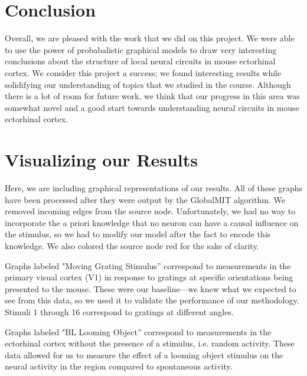 \documentclass{article}
\begin{document}
\section{Conclusion}

Overall, we are pleased with the work that we did on this project. We were 
able to use the power of probabalistic graphical models to draw very 
interesting conclusions about the structure of local neural circuits in mouse 
ectorhinal cortex. We consider this project a success; we found interesting 
results while solidifying our understanding of topics that we studied in the 
course. Although there is a lot of room for future work, we think that our 
progress in this area was somewhat novel and a good start towards 
understanding neural circuits in mouse ectorhinal cortex. \par




\newpage
\appendix
\section{Visualizing our Results}

Here, we are including graphical representations of our results. All of these 
graphs have been processed after they were output by the GlobalMIT algorithm. 
We removed incoming edges from the source node. Unfortunately, we had no way 
to incorporate the a priori knowledge that no neuron can have a causal 
influence on the stimulus, so we had to modify our model after the fact to 
encode this knowledge. We also colored the source node red for the sake of 
clarity. \par

Graphs labeled "Moving Grating Stimulus'' correspond to measurements in the 
primary visual cortex (V1) in response to gratings at specific orientations 
being presented to the mouse. These were our baseline—we knew what we 
expected to see from this data, so we used it to validate the performance of 
our methodology. Stimuli 1 through 16 correspond to gratings at different 
angles. \par

Graphs labeled "BL Looming Object'' correspond to measurements in the 
ectorhinal cortex without the presence of a stimulus, i.e. random activity. These data
allowed for us to measure the effect of a looming object stimulus on the 
neural activity in the region compared to spontaneous activity. \par
\end{document}
